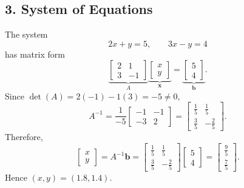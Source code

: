 \documentclass[11pt]{article}
\begin{document}
\subsection*{3. System of Equations}
The system
\[
2x+y=5,\qquad 3x-y=4
\]
has matrix form
\[
\underbrace{\begin{bmatrix}2&1\\3&-1\end{bmatrix}}_{A}
\underbrace{\begin{bmatrix}x\\y\end{bmatrix}}_{\mathbf{x}}
=
\underbrace{\begin{bmatrix}5\\4\end{bmatrix}}_{\mathbf{b}}.
\]
Since $\det(A)=2(-1)-1(3)=-5\ne0$,
\[
A^{-1}=\frac{1}{-5}\begin{bmatrix}-1&-1\\-3&2\end{bmatrix}
=\begin{bmatrix}\tfrac15&\tfrac15\\\tfrac35&-\tfrac25\end{bmatrix}.
\]
Therefore,
\[
\begin{bmatrix}x\\y\end{bmatrix}
=A^{-1}\mathbf b
=\begin{bmatrix}\tfrac15&\tfrac15\\\tfrac35&-\tfrac25\end{bmatrix}
\begin{bmatrix}5\\4\end{bmatrix}
=\boxed{\begin{bmatrix}\tfrac95\\\tfrac75\end{bmatrix}}.
\]
Hence $(x,y)=(1.8,1.4)$.
\end{document}

